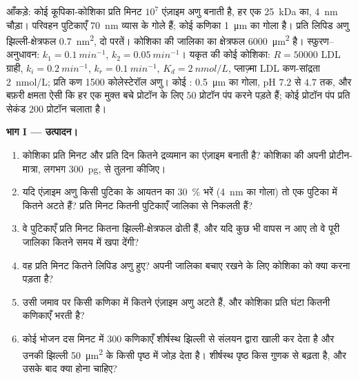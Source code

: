 \begin{problem}
\label{pb:b3:membrane-traffic:1}
आँकड़े: कोई कूपिका-कोशिका प्रति मिनट $10^{7}$ एंज़ाइम अणु बनाती है, हर एक
\qty{25}{kDa} का, \qty{4}{nm} चौड़ा। परिवहन पुटिकाएँ
\qty{70}{nm} व्यास के गोले हैं; कोई कणिका \qty{1}{\micro m} का गोला है।
प्रति लिपिड अणु झिल्ली-क्षेत्रफल \qty{0.7}{nm^2}, दो परतें। कोशिका की
जालिका का क्षेत्रफल \qty{6000}{\micro m^2} है। स्फुरण--अनुधावन:
$k_{1} = \qty{0.1}{min^{-1}}$, $k_{2} = \qty{0.05}{min^{-1}}$। यकृत की
कोई कोशिका: $R = \num{50000}$ LDL ग्राही, $k_{i} = \qty{0.2}{min^{-1}}$,
$k_{r} = \qty{0.1}{min^{-1}}$, $K_{d} = \qty{2}{nmol/L}$, प्लाज़्मा LDL
कण-सांद्रता \qty{2}{nmol/L}; प्रति कण \num{1500} कोलेस्टेरॉल अणु।
कोई : \qty{0.5}{\micro m} का गोला, pH $7.2$ से $4.7$ तक,
और बफ़री क्षमता ऐसी कि हर एक मुक्त बचे प्रोटॉन के लिए $50$ प्रोटॉन पंप
करने पड़ते हैं; कोई प्रोटॉन पंप प्रति सेकंड $200$ प्रोटॉन चलाता है।

\medskip
\noindent\textbf{भाग I --- उत्पादन।}
\begin{enumerate}
  \item कोशिका प्रति मिनट और प्रति दिन कितने द्रव्यमान का एंज़ाइम
        बनाती है? कोशिका की अपनी प्रोटीन-मात्रा, लगभग
        \qty{300}{pg}, से तुलना कीजिए।
  \item यदि एंज़ाइम अणु किसी पुटिका के आयतन का \qty{30}{\%} भरें
        (\qty{4}{nm} का गोला) तो एक पुटिका में कितने अटते हैं? प्रति
        मिनट कितनी पुटिकाएँ जालिका से निकलती हैं?
  \item वे पुटिकाएँ प्रति मिनट कितना झिल्ली-क्षेत्रफल ढोती हैं, और यदि
        कुछ भी वापस न आए तो वे पूरी जालिका कितने समय में खपा देंगी?
  \item वह प्रति मिनट कितने लिपिड अणु हुए? अपनी जालिका बचाए रखने के
        लिए कोशिका को क्या करना पड़ता है?
  \item उसी जमाव पर किसी कणिका में कितने एंज़ाइम अणु अटते हैं, और
        कोशिका प्रति घंटा कितनी कणिकाएँ भरती है?
  \item कोई भोजन दस मिनट में $300$ कणिकाएँ शीर्षस्थ झिल्ली से संलयन
        द्वारा खाली कर देता है और उनकी झिल्ली
        \qty{50}{\micro m^2} के किसी पृष्ठ में जोड़ देता है। शीर्षस्थ
        पृष्ठ किस गुणक से बढ़ता है, और उसके बाद क्या होना चाहिए?
\end{enumerate}


\end{problem}
